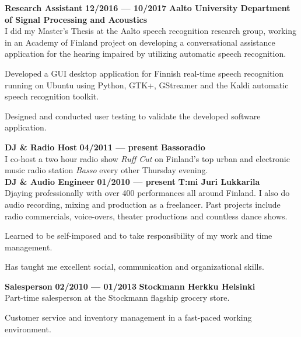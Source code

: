 \documentclass[8pt,a4paper,oneside]{article}
\newcommand{\myrule}{\vspace{0.5mm} {\color{lightgray}{\hrule height 0.5pt width \textwidth depth 0pt}} \vspace{1mm}}
\newcommand{\titledate}[2]{{\bfseries \color{textcolor}  \fontsize{11.5}{11.5}\selectfont #1} \hfill \textbf{#2} \myrule}
\newcommand{\workplace}[1]{{\bfseries \fontsize{10.5}{10.5}\selectfont #1}}
\newcommand{\sectitle}[1]{{\sc \bfseries \LARGE #1}}
\newcommand{\boxarc}{2.5mm}
\newcommand{\boxtop}{1.5mm}
\begin{document}
\begin{minipage}[t]{0.638\textwidth}
\begin{tcolorbox}[top=1mm,bottom=1mm,right=1mm,left=1mm,arc=\boxarc,toptitle=\boxtop,bottomtitle=1mm,title=\sectitle{Experience},box align=bottom]
		\titledate{Research Assistant}{12/2016 --- 10/2017}
		\workplace{Aalto University Department of Signal Processing and Acoustics} \\
		I did my Master’s Thesis at the Aalto speech recognition research group, working in an Academy of Finland project on developing a conversational assistance application for the hearing impaired by utilizing automatic speech recognition.
		\begin{cvlist}
			\item Developed a GUI desktop application for Finnish real-time speech recognition running on Ubuntu using Python, GTK+, GStreamer and the Kaldi automatic speech recognition toolkit.
			\item Designed and conducted user testing to validate the developed software application. \\
		\end{cvlist}
		
		\titledate{DJ \& Radio Host}{04/2011 --- present}
		\workplace{Bassoradio} \\
		I co-host a two hour radio show \textit{Ruff Cut} on Finland’s top urban and electronic music radio station \textit{Basso} every other Thursday evening. \\
		
		\titledate{DJ \& Audio Engineer}{01/2010 --- present}
		\workplace{T:mi Juri Lukkarila} \\
		Djaying professionally with over 400 performances all around Finland. I also do audio recording, mixing and production as a freelancer. Past projects include radio commercials, voice-overs, theater productions and countless dance shows.
		\begin{cvlist}
			\item Learned to be self-imposed and to take responsibility of my work and time management.
			\item Has taught me excellent social, communication and organizational skills. \\
		\end{cvlist}
		
		\titledate{Salesperson }{02/2010 --- 01/2013}
		\workplace{Stockmann Herkku Helsinki} \\
		Part-time salesperson at the Stockmann flagship grocery store.
		\begin{cvlist}
			\item Customer service and inventory management in a fast-paced working environment.
		\end{cvlist}
	\end{tcolorbox}
	
\end{minipage}%
\end{document}
